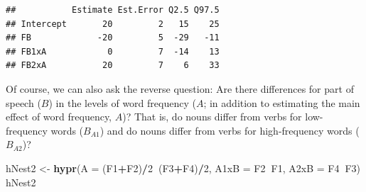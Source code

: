 \documentclass[12pt,]{krantz}
\newenvironment{Shaded}{\begin{snugshade}}{\end{snugshade}}
\newcommand{\DataTypeTok}[1]{\textcolor[rgb]{0.13,0.29,0.53}{#1}}
\newcommand{\DecValTok}[1]{\textcolor[rgb]{0.00,0.00,0.81}{#1}}
\newcommand{\KeywordTok}[1]{\textcolor[rgb]{0.13,0.29,0.53}{\textbf{#1}}}
\newcommand{\NormalTok}[1]{#1}
\newcommand{\OperatorTok}[1]{\textcolor[rgb]{0.81,0.36,0.00}{\textbf{#1}}}
\newcommand{\StringTok}[1]{\textcolor[rgb]{0.31,0.60,0.02}{#1}}
\theoremstyle{definition}
\theoremstyle{definition}
\theoremstyle{definition}
\theoremstyle{remark}
\begin{document}
\begin{Shaded}
\end{Shaded}

\begin{verbatim}
##           Estimate Est.Error Q2.5 Q97.5
## Intercept       20         2   15    25
## FB             -20         5  -29   -11
## FB1xA            0         7  -14    13
## FB2xA           20         7    6    33
\end{verbatim}

Of course, we can also ask the reverse question: Are there differences for part of speech (\(B\)) in the levels of word frequency (\(A\); in addition to estimating the main effect of word frequency, \(A\))? That is, do nouns differ from verbs for low-frequency words (\(B_{A1}\)) and do nouns differ from verbs for high-frequency words (\(B_{A2}\))?

\begin{Shaded}
\begin{Highlighting}[]
\NormalTok{hNest2 <-}\StringTok{ }\KeywordTok{hypr}\NormalTok{(}\DataTypeTok{A    =}\NormalTok{ (F1}\OperatorTok{+}\NormalTok{F2)}\OperatorTok{/}\DecValTok{2}\OperatorTok{~}\NormalTok{(F3}\OperatorTok{+}\NormalTok{F4)}\OperatorTok{/}\DecValTok{2}\NormalTok{,}
               \DataTypeTok{A1xB =}\NormalTok{ F2}\OperatorTok{~}\NormalTok{F1,}
               \DataTypeTok{A2xB =}\NormalTok{ F4}\OperatorTok{~}\NormalTok{F3)}
\NormalTok{hNest2}
\end{Highlighting}
\end{Shaded}
\end{document}
